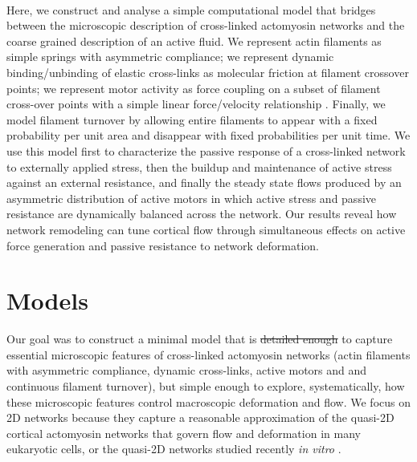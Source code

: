 \documentclass[10pt,letterpaper]{article}
\providecommand{\DIFaddtex}[1]{{\protect\color{blue}\uwave{#1}}} %
\providecommand{\DIFdeltex}[1]{{\protect\color{red}\sout{#1}}}                      %
\providecommand{\DIFaddbegin}{} %
\providecommand{\DIFaddend}{} %
\providecommand{\DIFdelbegin}{} %
\providecommand{\DIFdelend}{} %
\providecommand{\DIFadd}[1]{\texorpdfstring{\DIFaddtex{#1}}{#1}} %
\providecommand{\DIFdel}[1]{\texorpdfstring{\DIFdeltex{#1}}{}} %
\begin{document}
\paragraph{}  Here, we construct and analyse a simple computational model that bridges between the microscopic description of cross-linked actomyosin networks and the coarse grained description of an active fluid.  We represent actin filaments as simple springs with asymmetric compliance; we represent dynamic binding/unbinding of elastic cross-links as molecular friction \cite{theo_friction,theo_frictionSam,theo_molefric} at filament crossover points; we represent motor activity as force coupling on a subset of filament cross-over points with a simple linear force/velocity relationship \cite{theo_frictionShila}.  Finally, we model filament turnover by allowing entire filaments to appear with a fixed probability per unit area and disappear with fixed probabilities per unit time. We use this model first to characterize the passive response of a cross-linked network to externally applied stress, then the buildup and maintenance of active stress against an external resistance, and finally the steady state flows produced by an asymmetric distribution of active motors in which active stress and passive resistance are dynamically balanced across the network.  Our results reveal how network remodeling can tune cortical flow through simultaneous effects on active force generation and passive resistance to network deformation. 


\section*{Models}

Our goal was to construct a minimal model that is \DIFdelbegin \DIFdel{detailed enough }\DIFdelend \DIFaddbegin \DIFadd{sufficiently detailed }\DIFaddend to capture essential microscopic features of cross-linked actomyosin networks (actin filaments with asymmetric compliance, dynamic cross-links, active motors and and continuous filament turnover), but simple enough to explore, systematically, how these microscopic features control macroscopic deformation and flow. We focus on 2D networks because they capture a reasonable approximation of the quasi-2D cortical actomyosin networks that govern flow and deformation in many eukaryotic cells\cite{cellmech_flows, salbreuxbphs}, or the quasi-2D networks studied recently {\em in vitro} \cite{rheo_2D1,rheo_2D2}.
\end{document}
